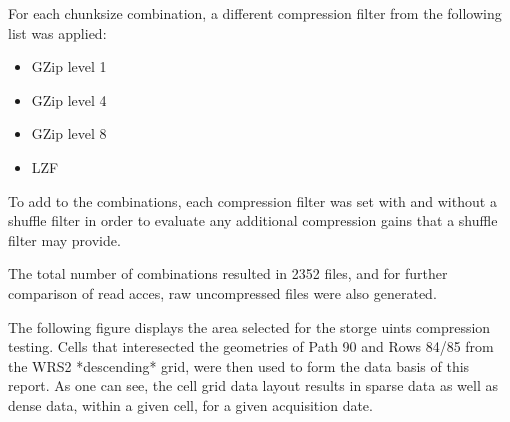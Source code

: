 \documentclass[a4paper]{article}
\begin{document}
    \begin{flushleft}
    For each chunksize combination, a different compression filter from the following list was applied:
    \end{flushleft}

    \begin{itemize}
      \item GZip level 1
      \item GZip level 4
      \item GZip level 8
      \item LZF
    \end{itemize}

    \begin{flushleft}
    To add to the combinations, each compression filter was set with and without a shuffle filter in order to evaluate any additional compression gains that a shuffle filter may provide. \par
    The total number of combinations resulted in 2352 files, and for further comparison of read acces, raw uncompressed files were also generated.

    The following figure displays the area selected for the storge uints compression testing. Cells that interesected the geometries of Path 90 and Rows 84/85 from the WRS2 *descending* grid, were then used to form the data basis of this report. As one can see, the cell grid data layout results in sparse data as well as dense data, within a given cell, for a given acquisition date.
    \end{flushleft}
\end{document}

